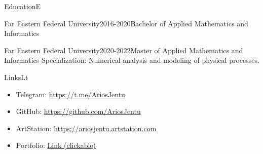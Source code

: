\documentclass[10pt]{extarticle}
\begin{document}
	\setlength{\currentpos}{\getposy+5pt}
	
	\begin{centralpart}{Education}{E}{}
		\begin{titleblock}{Far Eastern Federal University}{2016-2020}{Bachelor of Applied Mathematics and Informatics}{}
		\end{titleblock}
		\begin{titleblock}{Far Eastern Federal University}{2020-2022}{Master of Applied Mathematics and Informatics}{}
			Specialization: Numerical analysis and modeling of physical processes.
		\end{titleblock}
	\end{centralpart}

	\setlength{\currentpos}{\getposy+5pt}
	\begin{centralpart}{Links}{L}{t}
		\begin{titleblock}{}{}{}{}
			\vspace*{-25pt}
			\begin{itemize}[label=$\circ$]
				\item Telegram: {\color{sidetopsep}\href{https://t.me/AriosJentu}{https://t.me/AriosJentu}} \vp
				\item GitHub: {\color{sidetopsep}\href{https://github.com/AriosJentu}{https://github.com/AriosJentu}} \vp
				\item ArtStation: {\color{sidetopsep}\href{https://AriosJentu.artstation.com/}{https://ariosjentu.artstation.com}} \vp
				\item Portfolio: {\color{sidetopsep}\href{https://drive.google.com/drive/folders/1hcmudyfBtrOo7_3qARUckmqdiUvxr0jT?usp=drive_link}{Link (clickable)}} \vp
			\end{itemize}
		\end{titleblock}
	\end{centralpart}

	\setlength{\currentpos}{\getposy+20pt}

	\signature{S}
\end{document}
